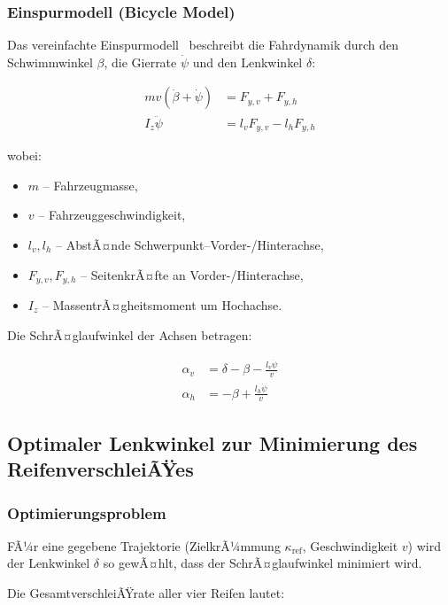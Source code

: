 ﻿\documentclass[12pt,a4paper]{article}
\theoremstyle{definition}
\theoremstyle{remark}
\begin{document}
\subsubsection{Einspurmodell (Bicycle Model)}

Das vereinfachte Einspurmodell~\cite{Rajamani2006} beschreibt die Fahrdynamik
durch den Schwimmwinkel $\beta$, die Gierrate $\dot{\psi}$ und den Lenkwinkel $\delta$:

\begin{align}
  m v (\dot{\beta} + \dot{\psi}) &= F_{y,v} + F_{y,h} \label{eq:bicycle1}\\
  I_z \ddot{\psi} &= l_v F_{y,v} - l_h F_{y,h} \label{eq:bicycle2}
\end{align}

wobei:
\begin{itemize}[nosep]
  \item $m$ -- Fahrzeugmasse,
  \item $v$ -- Fahrzeuggeschwindigkeit,
  \item $l_v, l_h$ -- AbstÃ¤nde Schwerpunkt--Vorder-/Hinterachse,
  \item $F_{y,v}, F_{y,h}$ -- SeitenkrÃ¤fte an Vorder-/Hinterachse,
  \item $I_z$ -- MassentrÃ¤gheitsmoment um Hochachse.
\end{itemize}

Die SchrÃ¤glaufwinkel der Achsen betragen:

\begin{align}
  \alpha_v &= \delta - \beta - \frac{l_v \dot{\psi}}{v} \label{eq:alpha_v}\\
  \alpha_h &= -\beta + \frac{l_h \dot{\psi}}{v} \label{eq:alpha_h}
\end{align}

\subsection{Optimaler Lenkwinkel zur Minimierung des ReifenverschleiÃŸes}

\subsubsection{Optimierungsproblem}

FÃ¼r eine gegebene Trajektorie (ZielkrÃ¼mmung $\kappa_{\mathrm{ref}}$, Geschwindigkeit $v$)
wird der Lenkwinkel $\delta$ so gewÃ¤hlt, dass der SchrÃ¤glaufwinkel minimiert wird.

Die GesamtverschleiÃŸrate aller vier Reifen lautet:
\end{document}
